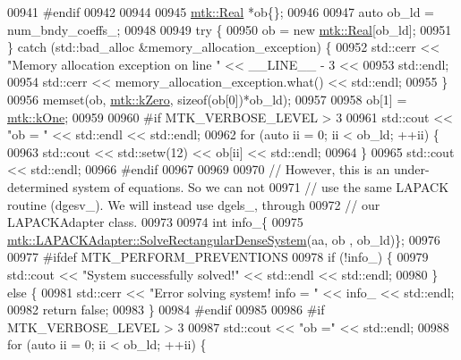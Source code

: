 \begin{DoxyCode}
{{00941 \textcolor{preprocessor}{    #endif}
00942 
00944 
00945     \hyperlink{group__c01-roots_gac080bbbf5cbb5502c9f00405f894857d}{mtk::Real} *ob\{\};
00946 
00947     \textcolor{keyword}{auto} ob\_ld = num\_bndy\_coeffs\_;
00948 
00949     \textcolor{keywordflow}{try} \{
00950       ob = \textcolor{keyword}{new} \hyperlink{group__c01-roots_gac080bbbf5cbb5502c9f00405f894857d}{mtk::Real}[ob\_ld];
00951     \} \textcolor{keywordflow}{catch} (std::bad\_alloc &memory\_allocation\_exception) \{
00952       std::cerr << \textcolor{stringliteral}{"Memory allocation exception on line "} << \_\_LINE\_\_ - 3 <<
00953         std::endl;
00954       std::cerr << memory\_allocation\_exception.what() << std::endl;
00955     \}
00956     memset(ob, \hyperlink{group__c01-roots_ga59a451a5fae30d59649bcda274fea271}{mtk::kZero}, \textcolor{keyword}{sizeof}(ob[0])*ob\_ld);
00957 
00958     ob[1] = \hyperlink{group__c01-roots_ga26407c24d43b6b95480943340d285c71}{mtk::kOne};
00959 
00960 \textcolor{preprocessor}{    #if MTK\_VERBOSE\_LEVEL > 3}
00961     std::cout << \textcolor{stringliteral}{"ob = "} << std::endl << std::endl;
00962     \textcolor{keywordflow}{for} (\textcolor{keyword}{auto} ii = 0; ii < ob\_ld; ++ii) \{
00963       std::cout << std::setw(12) << ob[ii] << std::endl;
00964     \}
00965     std::cout << std::endl;
00966 \textcolor{preprocessor}{    #endif}
00967 
00969 
00970     \textcolor{comment}{// However, this is an under-determined system of equations. So we can not}
00971     \textcolor{comment}{// use the same LAPACK routine (dgesv\_). We will instead use dgels\_, through}
00972     \textcolor{comment}{// our LAPACKAdapter class.}
00973 
00974     \textcolor{keywordtype}{int} info\_\{
00975       \hyperlink{classmtk_1_1LAPACKAdapter_a380f148ffdf96bae2f79ae28f1a6560c}{mtk::LAPACKAdapter::SolveRectangularDenseSystem}(aa, ob
      , ob\_ld)\};
00976 
00977 \textcolor{preprocessor}{    #ifdef MTK\_PERFORM\_PREVENTIONS}
00978     \textcolor{keywordflow}{if} (!info\_) \{
00979       std::cout << \textcolor{stringliteral}{"System successfully solved!"} << std::endl << std::endl;
00980     \} \textcolor{keywordflow}{else} \{
00981       std::cerr << \textcolor{stringliteral}{"Error solving system! info = "} << info\_ << std::endl;
00982       \textcolor{keywordflow}{return} \textcolor{keyword}{false};
00983     \}
00984 \textcolor{preprocessor}{    #endif}
00985 
00986 \textcolor{preprocessor}{    #if MTK\_VERBOSE\_LEVEL > 3}
00987     std::cout << \textcolor{stringliteral}{"ob ="} << std::endl;
00988     \textcolor{keywordflow}{for} (\textcolor{keyword}{auto} ii = 0; ii < ob\_ld; ++ii) \{
}}
\end{DoxyCode}
